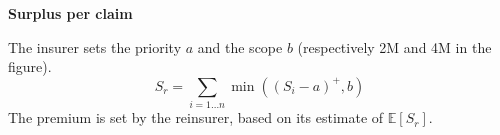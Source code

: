 \begin{f}
\textbf{Surplus per claim}
	
The insurer sets the priority $a$ and the scope $b$ (respectively 2M\EUR{} and 4M\EUR{} in the figure).
$$
S_r= \sum_{i=1\ldots n} \min\left( \left( S_i-a\right)^+,b\right)  
$$
The premium is set by the reinsurer, based on its estimate of $\mathbb{E}[S_r]$.


\end{f}
